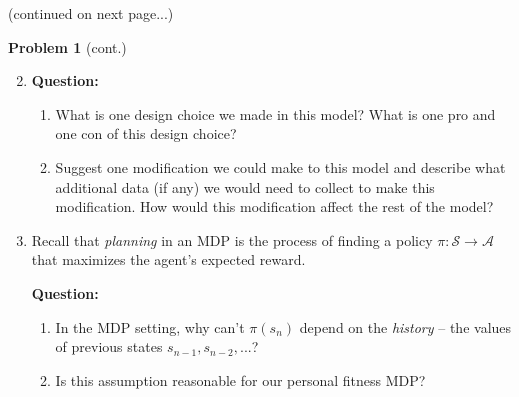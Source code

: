 \documentclass[submit]{harvardml}
\begin{document}
\begin{problem}
\begin{enumerate}

    (continued on next page...)
\end{enumerate}
\end{problem}
\begin{framed}
    \noindent\textbf{Problem 1} (cont.)
   \begin{enumerate} 
       \setcounter{enumi}{1}
 \item \textbf{Question:} 
    \begin{enumerate}
        \item What is one design choice we made in this model? What is one pro and one con of this design choice?
        \item Suggest one modification we could make to this model and describe what additional data (if any) we would need to collect to make this modification. How would this modification affect the rest of the model?
    \end{enumerate}
     \item Recall that \textit{planning} in an MDP is the process of finding a policy $\pi: \mathcal{S} \rightarrow \mathcal{A}$ that maximizes the agent's expected reward.
     
     \textbf{Question:}
     \begin{enumerate}
         \item In the MDP setting, why can't $\pi(s_{n})$ depend on the \textit{history} -- the values of previous states $s_{n - 1}, s_{n - 2}, ...$?
         \item Is this assumption reasonable for our personal fitness MDP?
     \end{enumerate}
      

\end{enumerate}
\end{framed}
\end{document}
